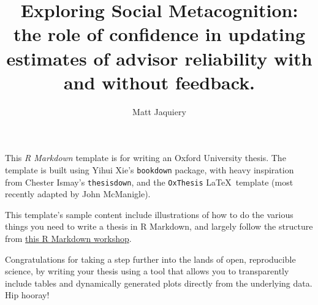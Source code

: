 \documentclass[a4paper, nobind]{templates/ociamthesis}
\title{Exploring Social Metacognition:\\
the role of confidence in updating estimates of advisor reliability with and without feedback.}
\author{Matt Jaquiery}
\begin{document}
\setlength{\textbaselineskip}{22pt plus2pt}

\setlength{\frontmatterbaselineskip}{17pt plus1pt minus1pt}

\setlength{\abstractseparatelineskip}{13pt plus1pt minus1pt}
\setlength{\abstractseparateparskip}{0pt plus 1pt}

\setlength{\parskip}{2pt plus 1pt}


\setlength{\baselineskip}{\textbaselineskip}



\setcounter{secnumdepth}{2}
\setcounter{tocdepth}{2}


\begin{abstractseparate}
  This \emph{R Markdown} template is for writing an Oxford University thesis. The template is built using Yihui Xie's \texttt{bookdown} package, with heavy inspiration from Chester Ismay's \texttt{thesisdown}, and the \texttt{OxThesis} \LaTeX~template (most recently adapted by John McManigle).
  
  This template's sample content include illustrations of how to do the various things you need to write a thesis in R Markdown, and largely follow the structure from \href{https://ulyngs.github.io/rmarkdown-workshop-2019/}{this R Markdown workshop}.
  
  Congratulations for taking a step further into the lands of open, reproducible science, by writing your thesis using a tool that allows you to transparently include tables and dynamically generated plots directly from the underlying data. Hip hooray!
\end{abstractseparate}
\end{document}
